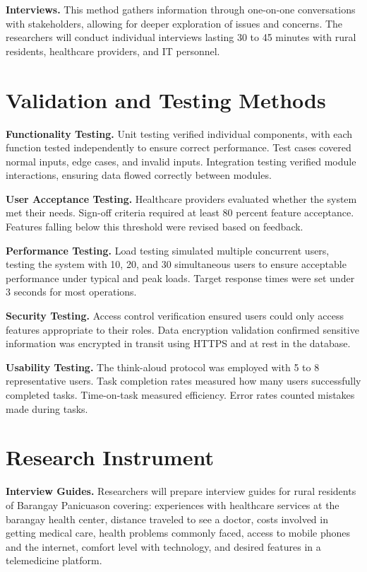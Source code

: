 \documentclass[12pt]{report}
\begin{document}
\noindent\textbf{Interviews.} This method gathers information through one-on-one
conversations with stakeholders, allowing for deeper exploration of issues and
concerns. The researchers will conduct individual interviews lasting 30 to 45
minutes with rural residents, healthcare providers, and IT personnel.

\section*{Validation and Testing Methods}

\noindent\textbf{Functionality Testing.} Unit testing verified individual components,
with each function tested independently to ensure correct performance. Test
cases covered normal inputs, edge cases, and invalid inputs. Integration testing
verified module interactions, ensuring data flowed correctly between modules.

\noindent\textbf{User Acceptance Testing.} Healthcare providers evaluated whether the
system met their needs. Sign-off criteria required at least 80 percent feature
acceptance. Features falling below this threshold were revised based on
feedback.

\noindent\textbf{Performance Testing.} Load testing simulated multiple concurrent users,
testing the system with 10, 20, and 30 simultaneous users to ensure acceptable
performance under typical and peak loads. Target response times were set under
3 seconds for most operations.

\noindent\textbf{Security Testing.} Access control verification ensured users could only
access features appropriate to their roles. Data encryption validation confirmed
sensitive information was encrypted in transit using HTTPS and at rest in the
database.

\noindent\textbf{Usability Testing.} The think-aloud protocol was employed with 5 to 8
representative users. Task completion rates measured how many users successfully
completed tasks. Time-on-task measured efficiency. Error rates counted mistakes
made during tasks.

\section*{Research Instrument}

\noindent\textbf{Interview Guides.} Researchers will prepare interview guides for rural
residents of Barangay Panicuason covering: experiences with healthcare services
at the barangay health center, distance traveled to see a doctor, costs involved
in getting medical care, health problems commonly faced, access to mobile phones
and the internet, comfort level with technology, and desired features in a
telemedicine platform.
\end{document}

